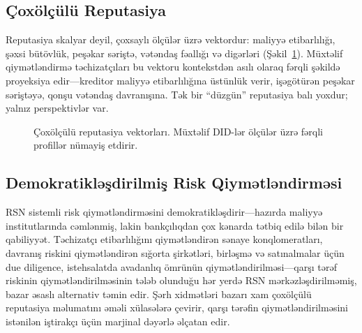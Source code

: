 \documentclass[11pt,a4paper,twocolumn]{article}
\begin{document}
\subsection{Çoxölçülü Reputasiya}

Reputasiya skalyar deyil, çoxsaylı ölçülər üzrə vektordur: maliyyə etibarlılığı, şəxsi bütövlük, peşəkar səriştə, vətəndaş fəallığı və digərləri (Şəkil~\ref{fig:reputation-radar}). Müxtəlif qiymətləndirmə təchizatçıları bu vektoru kontekstdən asılı olaraq fərqli şəkildə proyeksiya edir---kreditor maliyyə etibarlılığına üstünlük verir, işəgötürən peşəkar səriştəyə, qonşu vətəndaş davranışına. Tək bir ``düzgün'' reputasiya balı yoxdur; yalnız perspektivlər var.

\begin{figure}[ht]
\centering
{}
\caption{Çoxölçülü reputasiya vektorları. Müxtəlif DID-lər ölçülər üzrə fərqli profillər nümayiş etdirir.}
\label{fig:reputation-radar}
\end{figure}

\subsection{Demokratikləşdirilmiş Risk Qiymətləndirməsi}

RSN sistemli risk qiymətləndirməsini demokratikləşdirir---hazırda maliyyə institutlarında cəmlənmiş, lakin bankçılıqdan çox kənarda tətbiq edilə bilən bir qabiliyyət. Təchizatçı etibarlılığını qiymətləndirən sənaye konqlomeratları, davranış riskini qiymətləndirən sığorta şirkətləri, birləşmə və satınalmalar üçün due diligence, istehsalatda avadanlıq ömrünün qiymətləndirilməsi---qarşı tərəf riskinin qiymətləndirilməsinin tələb olunduğu hər yerdə RSN mərkəzləşdirilməmiş, bazar əsaslı alternativ təmin edir. Şərh xidmətləri bazarı xam çoxölçülü reputasiya məlumatını əməli xülasələrə çevirir, qarşı tərəfin qiymətləndirilməsini istənilən iştirakçı üçün marjinal dəyərlə əlçatan edir.
\end{document}
